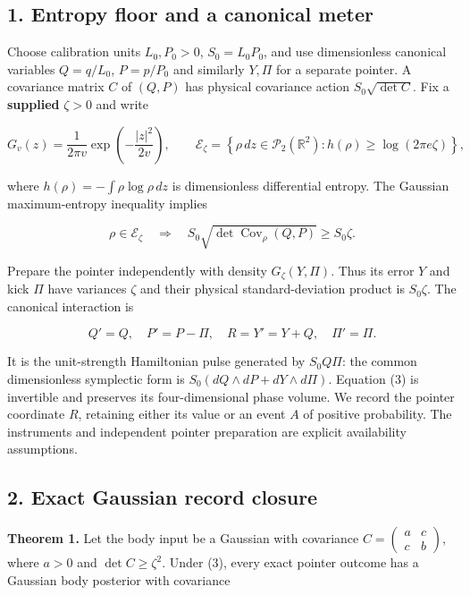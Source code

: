 \documentclass[11pt,a4paper]{article}
\begin{document}
\hypertarget{entropy-floor-and-a-canonical-meter}{%
\subsection{1. Entropy floor and a canonical
meter}\label{entropy-floor-and-a-canonical-meter}}

Choose calibration units \(L_0,P_0>0\), \(S_0=L_0P_0\), and use
dimensionless canonical variables \(Q=q/L_0\), \(P=p/P_0\) and similarly
\(Y,\Pi\) for a separate pointer. A covariance matrix \(C\) of \((Q,P)\)
has physical covariance action \(S_0\sqrt{\det C}\). Fix a
\textbf{supplied} \(\zeta>0\) and write

\[
 G_v(z)=\frac{1}{2\pi v}\exp\!\left(-\frac{|z|^2}{2v}\right),\qquad
 \mathcal E_\zeta=\left\{\rho\,dz\in\mathcal P_2(\mathbb R^2):
 h(\rho)\ge\log(2\pi e\zeta)\right\}, \tag{1}
\]

where \(h(\rho)=-\int\rho\log\rho\,dz\) is dimensionless differential
entropy. The Gaussian maximum-entropy inequality implies

\[
 \rho\in\mathcal E_\zeta\quad\Longrightarrow\quad
 S_0\sqrt{\det\operatorname{Cov}_\rho(Q,P)}\ge S_0\zeta. \tag{2}
\]

Prepare the pointer independently with density \(G_\zeta(Y,\Pi)\). Thus
its error \(Y\) and kick \(\Pi\) have variances \(\zeta\) and their
physical standard-deviation product is \(S_0\zeta\). The canonical
interaction is

\[
 Q'=Q,\quad P'=P-\Pi,\quad R=Y'=Y+Q,\quad \Pi'=\Pi. \tag{3}
\]

It is the unit-strength Hamiltonian pulse generated by \(S_0Q\Pi\): the
common dimensionless symplectic form is
\(S_0(dQ\wedge dP+dY\wedge d\Pi)\). Equation (3) is invertible and
preserves its four-dimensional phase volume. We record the pointer
coordinate \(R\), retaining either its value or an event \(A\) of
positive probability. The instruments and independent pointer
preparation are explicit availability assumptions.

\hypertarget{exact-gaussian-record-closure}{%
\subsection{2. Exact Gaussian record
closure}\label{exact-gaussian-record-closure}}

\textbf{Theorem 1.} Let the body input be a Gaussian with covariance
\(C=\begin{pmatrix}a&c\\c&b\end{pmatrix}\), where \(a>0\) and
\(\det C\ge\zeta^2\). Under (3), every exact pointer outcome has a
Gaussian body posterior with covariance
\end{document}
